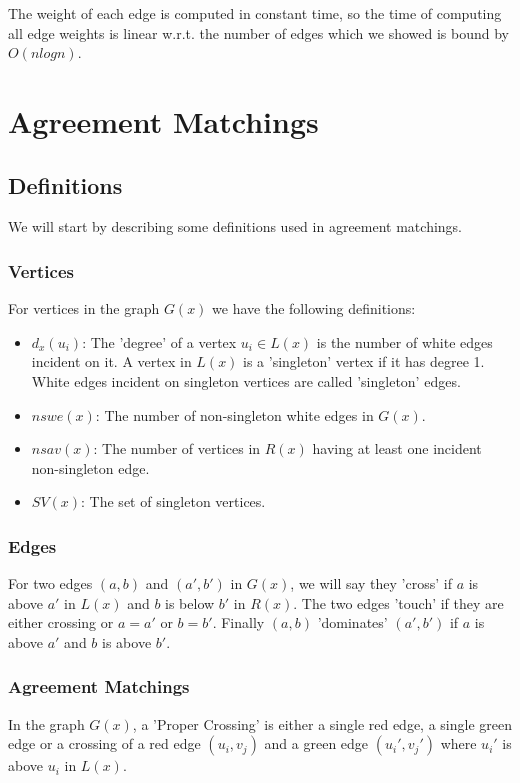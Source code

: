 The weight of each edge is computed in constant time, so the time of computing all edge weights is linear w.r.t. the number of edges which we showed is bound by $O(nlogn)$.

\section{Agreement Matchings}

\subsection{Definitions}
We will start by describing some definitions used in agreement matchings.

\subsubsection{Vertices}
For vertices in the graph $G(x)$ we have the following definitions:
\begin{itemize}
	\item $d_x(u_i)$: The 'degree' of a vertex $u_i \in L(x)$ is the number of white edges incident on it.
	\subitem A vertex in $L(x)$ is a 'singleton' vertex if it has degree 1.
	\subitem White edges incident on singleton vertices are called 'singleton' edges.
	\item $nswe(x)$: The number of non-singleton white edges in $G(x)$.
	\item $nsav(x)$: The number of vertices in $R(x)$ having at least one incident non-singleton edge.
	\item $SV(x)$: The set of singleton vertices.
\end{itemize}

\subsubsection{Edges}
For two edges $(a,b)$ and $(a',b')$ in $G(x)$, we will say they 'cross' if $a$ is above $a'$ in $L(x)$ and $b$ is below $b'$ in $R(x)$. The two edges 'touch' if they are either crossing or $a=a'$ or $b=b'$. Finally $(a,b)$ 'dominates' $(a',b')$ if $a$ is above $a'$ and $b$ is above $b'$.

\subsubsection{Agreement Matchings}
In the graph $G(x)$, a 'Proper Crossing' is either a single red edge, a single green edge or a crossing of a red edge $(u_i,v_j)$ and a green edge $(u_i',v_j')$ where $u_i'$ is above $u_i$ in $L(x)$.

